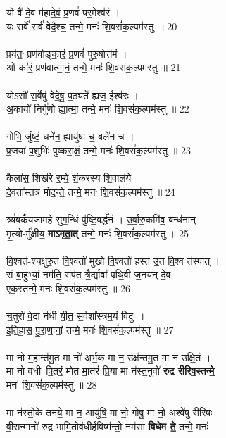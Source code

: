 यो वै॑ दे॒वं म॑हादे॒वं॒ प्र॒णवं॑ पर॒मेश्व॑रं ।\\
यः सर्वे॑ सर्व॑ वेदै॒श्च॒ तन्मे॒ मनः॑ शि॒वसं॑क॒ल्पम॑स्तु ॥ 20\\
\\
प्रय॑तः॒ प्रण॑वोङ्का॒रं॒ प्र॒णवं॑ पुरु॒षोत्त॑मं ।\\
ओं का॑रं॒ प्रण॑वात्मा॒नं॒ तन्मे॒ मनः॑ शि॒वसं॑क॒ल्पम॑स्तु ॥ 21\\
\\
योऽसौ॑ स॒र्वेषु॑ वेदे॒षु॒ प॒ठ्यते᳚ ह्यज॒ ईश्व॑रः ।\\
अ॒कायो॑ निर्गु॑णो ह्या॒त्मा॒ तन्मे॒ मनः॑ शि॒वसं॑क॒ल्पम॑स्तु ॥ 22\\
\\
गोभि॒ र्जुष्टं॒ धने॑न॒ ह्यायु॑षा च॒ बले॑न च ।\\
प्र॒जया॑ प॒शुभिः॑ पुष्करा॒क्षं॒ तन्मे॒ मनः॑ शि॒वसं॑क॒ल्पम॑स्तु ॥ 23\\
\\
कैला॑स॒ शिख॑रे र॒म्ये॒ शं॒कर॑स्य शि॒वाल॑ये ।\\
दे॒वता᳚स्तत्र॑ मोद॒न्ते॒ तन्मे॒ मनः॑ शि॒वसं॑क॒ल्पम॑स्तु ॥ 24\\
\\
त्र्यं॑बकंँयजामहे सुग॒न्धिं पु॑ष्टि॒वर्द्ध॑नं । उ॒र्वा॒रु॒कमि॑व॒ बन्ध॑नान्\\
मृ॒त्यो-र्मु॑क्षीय॒ \textbf{माऽमृता॒त्} तन्मे॒ मनः॑ शि॒वसं॑क॒ल्पम॑स्तु ॥ 25\\
\\
वि॒श्वत॑-श्चक्षुरु॒त वि॒श्वतो॑ मुखो वि॒श्वतो॑ हस्त उ॒त वि॒श्व त॑स्पात् ।\\
सं बा॒हुभ्यां॒ नम॑ति॒ संप॑त त्रै॒र्द्यावा॑ पृथि॒वी ज॒नय॑न् दे॒व\\
एक॒स्तन्मे॒ मनः॑ शि॒वसं॑क॒ल्पम॑स्तु ॥ 26\\
\\
च॒तुरो॑ वे॒दा न॑धी यी॒त॒ स॒र्वशा᳚स्त्रम॒यं वि॑दुः ।\\
इ॒ति॒हा॒स॒ पु॒रा॒णा॒नां॒ तन्मे॒ मनः॑ शि॒वसं॑क॒ल्पम॑स्तु ॥ 27\\
\\
मा नो॑ म॒हान्त॑मु॒त मा नो॑ अर्भ॒कं मा न॒ उक्ष॑न्तमु॒त मा न॑ उक्षि॒तं ।\\
मा नो॑ वधीः पि॒तरं॒ मोत मा॒तरं॑ प्रि॒या मा न॑स्त॒नुवो॑ \textbf{रुद्र रीरिष॒स्तन्मे॒}\\
मनः॑ शि॒वसं॑क॒ल्पम॑स्तु ॥ 28\\
\\
मा न॑स्तो॒के तन॑ये॒ मा न॒ आयु॑षि॒ मा नो॒ गोषु॒ मा नो॒ अश्वे॑षु रीरिषः ।\\
वी॒रान्मानो॑ रुद्र भामि॒तोव॑धीर्ह॒विष्म॑न्तो॒ नम॑सा \textbf{विधेम ते॒} तन्मे॒ मनः॑\\
